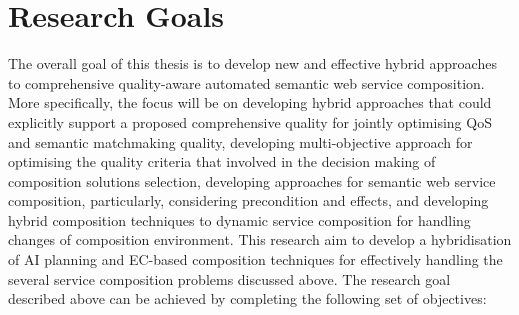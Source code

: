 \section{Research Goals}
The overall goal of this thesis is to develop new and effective hybrid approaches to comprehensive quality-aware automated semantic web service composition. More specifically, the focus will be on developing hybrid approaches that could explicitly support a proposed comprehensive quality for jointly optimising QoS and semantic matchmaking quality, developing multi-objective approach for optimising the quality criteria that involved in the decision making of composition solutions selection, developing approaches for semantic web service composition, particularly, considering precondition and effects, and developing hybrid composition techniques to dynamic service composition for handling changes of composition environment. This research aim to develop a hybridisation of AI planning and EC-based composition techniques for effectively handling the several service composition problems discussed above. The research goal described above can be achieved by completing the following set of objectives:


